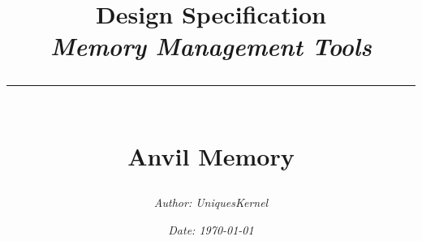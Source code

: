 \newcommand{\authorName}{UniquesKernel}
\newcommand{\titleName}{Design Specification}
\newcommand{\subject}{Memory Management Tools}
\newcommand{\projectType}{Anvil Memory}

\title{
\vspace*{1in}

{\huge \textbf{\titleName}}\\[0.5in]

{\Large \textit{\subject}}\\[0.2in]

\rule{0.6\textwidth}{1pt}\\[0.2in]

\textbf{\projectType}\\

\vfill
}

\author{\textit{Author: \authorName}}
\date{\textit{Date: \today}}
